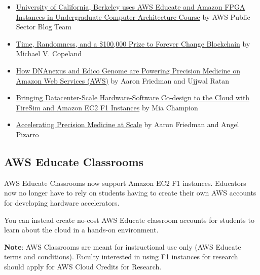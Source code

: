 \documentclass[a4paper]{article}
\begin{document}
    \begin{itemize}
        \item \href{https://aws.amazon.com/blogs/publicsector/university-of-berkeley-uses-aws-educate-for-amazon-fpga-accelerator-development-and-deployment-in-the-cloud/}{University of California, Berkeley uses AWS Educate and Amazon FPGA Instances in Undergraduate Computer Architecture Course} by AWS Public Sector Blog Team

        \item \href{https://aws.amazon.com/blogs/startups/competition-forever-change-blockchain/}{Time, Randomness, and a \$100,000 Prize to Forever Change Blockchain} by Michael V. Copeland

        \item \href{https://aws.amazon.com/blogs/apn/how-dnanexus-and-edico-genome-are-powering-precision-medicine-on-amazon-web-services-aws/}{How DNAnexus and Edico Genome are Powering Precision Medicine on Amazon Web Services (AWS)} by Aaron Friedman and Ujjwal Ratan

        \item \href{https://aws.amazon.com/blogs/compute/bringing-datacenter-scale-hardware-software-co-design-to-the-cloud-with-firesim-and-amazon-ec2-f1-instances/}{Bringing Datacenter-Scale Hardware-Software Co-design to the Cloud with FireSim and Amazon EC2 F1 Instances} by Mia Champion

        \item \href{https://aws.amazon.com/blogs/compute/accelerating-precision-medicine-at-scale/}{Accelerating Precision Medicine at Scale} by Aaron Friedman and Angel Pizarro
    \end{itemize}\newpage

    \subsection{AWS Educate Classrooms}

    AWS Educate Classrooms now support Amazon EC2 F1 instances. Educators now no longer have to rely on students having to create their own AWS accounts for developing hardware accelerators.\newline

    \noindent
    You can instead create no-cost AWS Educate classroom accounts for students to learn about the cloud in a hands-on environment.\newline

    \noindent
    \textbf{Note}: AWS Classrooms are meant for instructional use only (AWS Educate terms and conditions). Faculty interested in using F1 instances for research should apply for AWS Cloud Credits for Research.\newline
\end{document}
